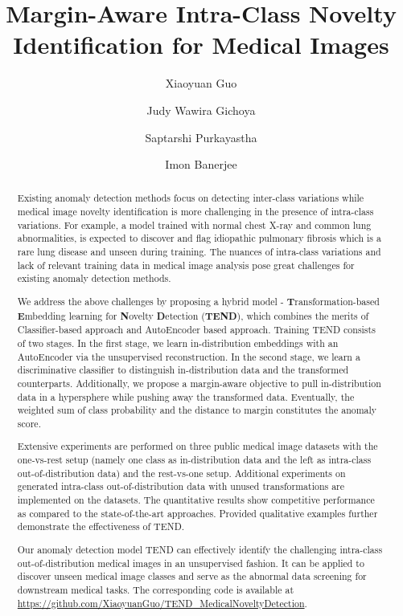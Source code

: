 \documentclass[12pt]{spieman}  %
\title{Margin-Aware Intra-Class Novelty Identification for Medical Images}
\author[a,*]{Xiaoyuan Guo}
\author[b,c]{Judy Wawira Gichoya}
\author[d]{Saptarshi Purkayastha}
\author[e]{Imon Banerjee}
\affil[a]{Emory University, Department of Computer Science}
\affil[b]{Emory University, Department of Radiology and Imaging Sciences}
\affil[c]{Emory University, Department of Biomedical Informatics}
\affil[d]{Indiana University-Purdue University Indianapolis, School of Informatics and Computing}
\affil[e]{Mayo clinic, Arizona State University}
\begin{document}
 
\maketitle

\begin{abstract}

Existing anomaly detection methods focus on detecting inter-class variations while medical image novelty identification is more challenging in the presence of intra-class variations. For example, a model trained with normal chest X-ray and common lung abnormalities, is expected to discover and flag idiopathic pulmonary fibrosis which is a rare lung disease and unseen during training. The nuances of intra-class variations and lack of relevant training data in medical image analysis pose great challenges for existing anomaly detection methods.

We address the above challenges by proposing a hybrid model - \textbf{T}ransformation-based \textbf{E}mbedding learning for \textbf{N}ovelty \textbf{D}etection (\textbf{TEND}), which combines the merits of Classifier-based approach and AutoEncoder based approach. Training TEND consists of two stages. In the first stage, we learn in-distribution embeddings with an AutoEncoder via the unsupervised reconstruction. In the second stage, we learn a discriminative classifier to distinguish in-distribution data and the transformed counterparts. Additionally, we propose a margin-aware objective to pull in-distribution data in a hypersphere while pushing away the transformed data. Eventually, the weighted sum of class probability and the distance to margin constitutes the anomaly score. 

Extensive experiments are performed on three public medical image datasets with the one-vs-rest setup (namely one class as in-distribution data and the left as intra-class out-of-distribution data) and the rest-vs-one setup. Additional experiments on generated intra-class out-of-distribution data with unused transformations are implemented on the datasets. The quantitative results show competitive performance as compared to the state-of-the-art approaches. Provided qualitative examples further demonstrate the effectiveness of TEND.   

Our anomaly detection model TEND can effectively identify the challenging intra-class out-of-distribution medical images in an unsupervised fashion. It can be applied to discover unseen medical image classes and serve as the abnormal data screening for downstream medical tasks. The corresponding code is available at \url{https://github.com/XiaoyuanGuo/TEND_MedicalNoveltyDetection}. 
\end{abstract}
\end{document}
